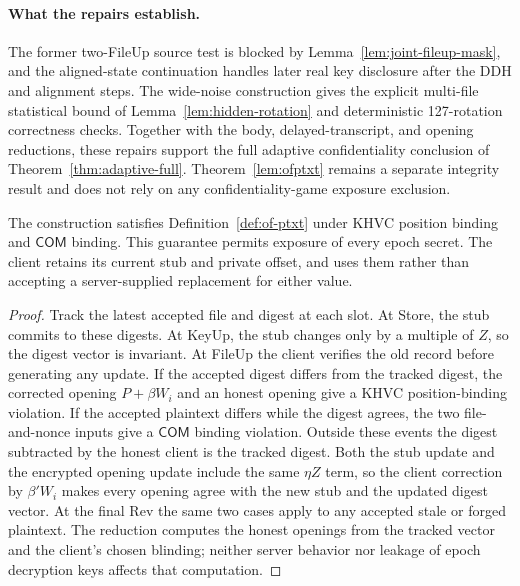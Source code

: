 \paragraph{What the repairs establish.}
The former two-FileUp source test is blocked by Lemma~\ref{lem:joint-fileup-mask}, and the aligned-state continuation handles later real key disclosure after the DDH and alignment steps. The wide-noise construction gives the explicit multi-file statistical bound of Lemma~\ref{lem:hidden-rotation} and deterministic 127-rotation correctness checks. Together with the body, delayed-transcript, and opening reductions, these repairs support the full adaptive confidentiality conclusion of Theorem~\ref{thm:adaptive-full}. Theorem~\ref{lem:ofptxt} remains a separate integrity result and does not rely on any confidentiality-game exposure exclusion.

\begin{theorem}
\label{lem:ofptxt}
The construction satisfies Definition~\ref{def:of-ptxt} under KHVC position binding and $\mathsf{COM}$ binding. This guarantee permits exposure of every epoch secret. The client retains its current stub and private offset, and uses them rather than accepting a server-supplied replacement for either value.
\end{theorem}
\begin{proof}
Track the latest accepted file and digest at each slot. At Store, the stub commits to these digests. At KeyUp, the stub changes only by a multiple of $Z$, so the digest vector is invariant. At FileUp the client verifies the old record before generating any update. If the accepted digest differs from the tracked digest, the corrected opening $P+\beta W_i$ and an honest opening give a KHVC position-binding violation. If the accepted plaintext differs while the digest agrees, the two file-and-nonce inputs give a $\mathsf{COM}$ binding violation. Outside these events the digest subtracted by the honest client is the tracked digest. Both the stub update and the encrypted opening update include the same $\eta Z$ term, so the client correction by $\beta'W_i$ makes every opening agree with the new stub and the updated digest vector. At the final Rev the same two cases apply to any accepted stale or forged plaintext. The reduction computes the honest openings from the tracked vector and the client's chosen blinding; neither server behavior nor leakage of epoch decryption keys affects that computation.
\end{proof}

